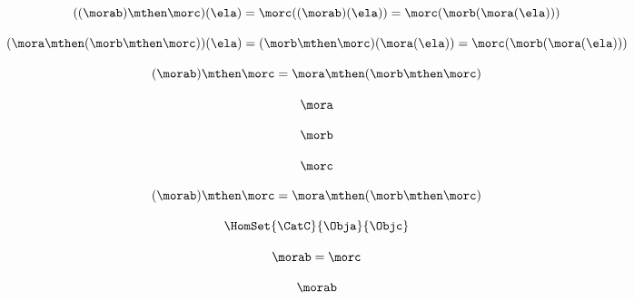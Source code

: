 \begin{forslides}
        
         \begin{equation}
            \label{eq:99}
            ((\morab) \mthen \morc)(\ela) =  \morc((\morab)(\ela)) = \morc (\morb (\mora (\ela)))
        \end{equation}
        
        
         \begin{equation}
            \label{eq:52}
            (\mora \mthen (\morb \mthen \morc))(\ela)
        =  (\morb \mthen \morc)(\mora(\ela)) = \morc (\morb (\mora (\ela)))
        \end{equation}
        
        
         \begin{equation}
            \label{eq:100}
            (\morab)
        \mthen \morc = \mora \mthen (\morb \mthen \morc)
        \end{equation}
        
        
         \begin{equation}
            \label{eq:101}
            \mora
        \end{equation}
        
        
        
         \begin{equation}
            \label{eq:102}
            \morb
        \end{equation}
        
        
         \begin{equation}
            \label{eq:103}
            \morc
        \end{equation}
        
        
         \begin{equation}
            \label{eq:104}
            (\morab) \mthen \morc = \mora \mthen (\morb \mthen \morc)
        \end{equation}
        
        
         \begin{equation}
            \label{eq:105}
            \HomSet{\CatC}{\Obja}{\Objc}
        \end{equation}
        
        
         \begin{equation}
            \label{eq:106}
            \morab = \morc
        \end{equation}
        
        
         \begin{equation}
            \label{eq:107}
            \morab
        \end{equation}
        

\end{forslides}
